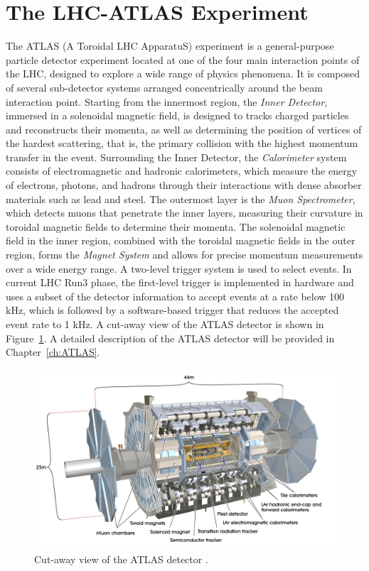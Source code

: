 \section{The LHC-ATLAS Experiment} \label{ATLAS}
The ATLAS (A Toroidal LHC ApparatuS) experiment is a general-purpose particle detector experiment located at one of the four main interaction points of the LHC, designed to explore a wide range of physics phenomena. It is composed of several sub-detector systems arranged concentrically around the beam interaction point. Starting from the innermost region, the \textit{Inner Detector}, immersed in a solenoidal magnetic field, is designed to tracks charged particles and reconstructs their momenta, as well as determining the position of vertices of the hardest scattering, that is, the primary collision with the highest momentum transfer in the event. Surrounding the Inner Detector, the \textit{Calorimeter} system consists of electromagnetic and hadronic calorimeters, which measure the energy of electrons, photons, and hadrons through their interactions with dense absorber materials such as lead and steel. The outermost layer is the \textit{Muon Spectrometer}, which detects muons that penetrate the inner layers, measuring their curvature in toroidal magnetic fields to determine their momenta. The solenoidal magnetic field in the inner region, combined with the toroidal magnetic fields in the outer region, forms the \textit{Magnet System} and allows for precise momentum measurements over a wide energy range. A two-level trigger system is used to select events. In current LHC Run3 phase, the first-level trigger is implemented in hardware and uses a subset of the detector information to accept events at a rate below 100 kHz, which is followed by a software-based trigger that reduces the accepted event rate to 1 kHz. A cut-away view of the ATLAS detector is shown in Figure~\ref{fig:ATLASDetector}. A detailed description of the ATLAS detector will be provided in Chapter~\ref{ch:ATLAS}.
\begin{figure}[htbp]
  \centering
  \includegraphics[width=1.0\textwidth]{figs/chapter1/ATLAS.png}
  \caption{Cut-away view of the ATLAS detector \cite{ATLASDetector2008}.}
  \label{fig:ATLASDetector}
\end{figure}
